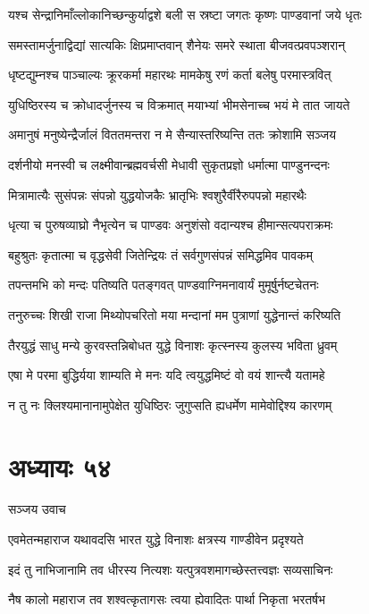 \twolineshloka
{यश्च सेन्द्रानिमाँल्लोकानिच्छन्कुर्याद्वशे बली}
{स स्रष्टा जगतः कृष्णः पाण्डवानां जये धृतः}


\twolineshloka
{समस्तामर्जुनाद्विद्यां सात्यकिः क्षिप्रमाप्तवान्}
{शैनेयः समरे स्थाता बीजवत्प्रवपञ्शरान्}


\twolineshloka
{धृष्टद्युम्नश्च पाञ्चाल्यः क्रूरकर्मा महारथः}
{मामकेषु रणं कर्ता बलेषु परमास्त्रवित्}


\twolineshloka
{युधिष्ठिरस्य च क्रोधादर्जुनस्य च विक्रमात्}
{मयाभ्यां भीमसेनाच्च भयं मे तात जायते}


\twolineshloka
{अमानुषं मनुष्येन्द्रैर्जालं विततमन्तरा}
{न मे सैन्यास्तरिष्यन्ति ततः क्रोशामि सञ्जय}


\twolineshloka
{दर्शनीयो मनस्वी च लक्ष्मीवान्ब्रह्मवर्चसी}
{मेधावी सुकृतप्रज्ञो धर्मात्मा पाण्डुनन्दनः}


\twolineshloka
{मित्रामात्यैः सुसंपन्नः संपन्नो युद्धयोजकैः}
{भ्रातृभिः श्वशुरैर्वीरैरुपपन्नो महारथैः}


\twolineshloka
{धृत्या च पुरुषव्याघ्रो नैभृत्येन च पाण्डवः}
{अनुशंसो वदान्यश्च हीमान्सत्यपराक्रमः}


\twolineshloka
{बहुश्रुतः कृतात्मा च वृद्धसेवी जितेन्द्रियः}
{तं सर्वगुणसंपन्नं समिद्धमिव पावकम्}


\twolineshloka
{तपन्तमभि को मन्दः पतिष्यति पतङ्गवत्}
{पाण्डवाग्निमनावार्यं मुमूर्षुर्नष्टचेतनः}


\twolineshloka
{तनुरुच्चः शिखी राजा मिथ्योपचरितो मया}
{मन्दानां मम पुत्राणां युद्धेनान्तं करिष्यति}


\twolineshloka
{तैरयुद्धं साधु मन्ये कुरवस्तन्निबोधत}
{युद्धे विनाशः कृत्स्नस्य कुलस्य भविता ध्रुवम्}


\twolineshloka
{एषा मे परमा बुद्धिर्यया शाम्यति मे मनः}
{यदि त्वयुद्धमिष्टं वो वयं शान्त्यै यतामहे}


\twolineshloka
{न तु नः क्लिश्यमानानामुपेक्षेत युधिष्ठिरः}
{जुगुप्सति ह्यधर्मेण मामेवोद्दिश्य कारणम्}


\chapter{अध्यायः ५४}
\twolineshloka
{सञ्जय उवाच}
{}


\twolineshloka
{एवमेतन्महाराज यथावदसि भारत}
{युद्धे विनाशः क्षत्रस्य गाण्डीवेन प्रदृश्यते}


\twolineshloka
{इदं तु नाभिजानामि तव धीरस्य नित्यशः}
{यत्पुत्रवशमागच्छेस्तत्त्वज्ञः सव्यसाचिनः}


\twolineshloka
{नैष कालो महाराज तव शश्वत्कृतागसः}
{त्वया ह्येवादितः पार्था निकृता भरतर्षभ}


